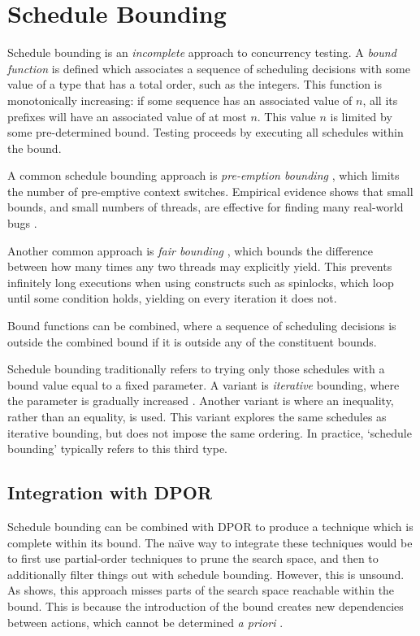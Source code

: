 \section{Schedule Bounding}
\label{sec:sct-bounding}

Schedule bounding \parencite{emmi2011,musuvathi2008,musuvathi2007} is an
\emph{incomplete} approach to concurrency testing.  A \emph{bound function} is
defined which associates a sequence of scheduling decisions with some value of a
type that has a total order, such as the integers.  This function is
monotonically increasing: if some sequence has an associated value of $n$, all
its prefixes will have an associated value of at most $n$.  This value $n$ is
limited by some pre-determined bound.  Testing proceeds by executing all
schedules within the bound.

A common schedule bounding approach is \emph{pre-emption
  bounding} \parencite{musuvathi2007}, which limits the number of
pre-emptive context switches.  Empirical evidence shows that small
bounds, and small numbers of threads, are effective for finding many
real-world bugs \parencite{thomson2014}.

Another common approach is \emph{fair bounding} \parencite{musuvathi2008},
which bounds the difference between how many times any two threads may
explicitly yield.  This prevents infinitely long executions when using
constructs such as spinlocks, which loop until some condition holds,
yielding on every iteration it does not.

Bound functions can be combined, where a sequence of scheduling
decisions is outside the combined bound if it is outside any of the
constituent bounds.

Schedule bounding traditionally refers to trying only those schedules
with a bound value equal to a fixed parameter.  A variant is
\emph{iterative} bounding, where the parameter is gradually
increased \parencite{musuvathi2007}.  Another variant is where an
inequality, rather than an equality, is used.  This variant explores
the same schedules as iterative bounding, but does not impose the same
ordering.  In practice, `schedule bounding' typically refers to this
third type.

\subsection{Integration with DPOR}

Schedule bounding can be combined with DPOR to produce a technique
which is complete within its bound.  The na\"{\i}ve way to integrate
these techniques would be to first use partial-order techniques to
prune the search space, and then to additionally filter things out
with schedule bounding.  However, this is unsound.  As
 shows, this approach misses parts of the
search space reachable within the bound.  This is because the
introduction of the bound creates new dependencies between actions,
which cannot be determined \emph{a priori} \parencite{coons2013}.

